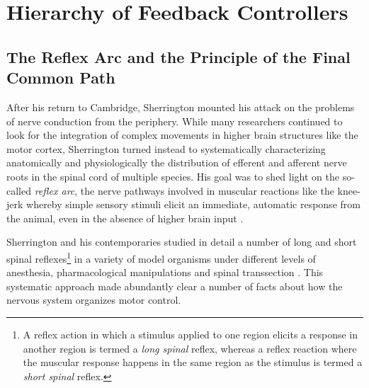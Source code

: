 \section{Hierarchy of Feedback Controllers}

\subsection{The Reflex Arc and the Principle of the Final Common Path}

After his return to Cambridge, Sherrington mounted his attack on the problems of nerve conduction from the periphery. While many researchers continued to look for the integration of complex movements in higher brain structures like the motor cortex, Sherrington turned instead to systematically characterizing anatomically and physiologically the distribution of efferent \cite{Sherrington1892} and afferent \cite{Sherrington1893a} nerve roots in the spinal cord of multiple species. His goal was to shed light on the so-called \emph{reflex arc}, the nerve pathways involved in muscular reactions like the knee-jerk whereby simple sensory stimuli elicit an immediate, automatic response from the animal, even in the absence of higher brain input \cite{Sherrington1893b}.

Sherrington and his contemporaries studied in detail a number of long and short spinal reflexes\footnote{A reflex action in which a stimulus applied to one region elicits a response in another region is termed a \emph{long spinal} reflex, whereas a reflex reaction where the muscular response happens in the same region as the stimulus is termed a \emph{short spinal} reflex.} in a variety of model organisms under different levels of anesthesia, pharmacological manipulations and spinal transsection \cite{Sherrington1903}. This systematic approach made abundantly clear a number of facts about how the nervous system organizes motor control.

